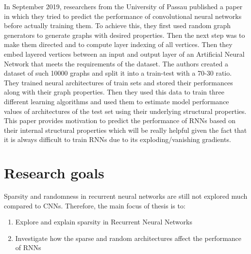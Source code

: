 \documentclass[acmlarge,screen,natbib=false]{acmart}
\begin{document}
In September 2019, researchers from the University of Passau published a paper \cite{julian} in which they tried to predict the performance of convolutional neural networks before actually training them. To achieve this, they first used random graph generators to generate graphs with desired properties. Then the next step was to make them directed and to compute layer indexing of all vertices. Then they embed layered vertices between an input and output layer of an Artificial Neural Network that meets the requirements of the dataset. The authors created a dataset of such 10000 graphs and split it into a train-test with a 70-30 ratio. They trained neural architectures of train sets and stored their performances along with their graph properties. Then they used this data to train three different learning algorithms and used them to estimate model performance values of architectures of the test set using their underlying structural properties. This paper provides motivation to predict the performance of RNNs based on their internal structural properties which will be really helpful given the fact that it is always difficult to train RNNs due to its exploding/vanishing gradients.

\section{Research goals}
Sparsity and randomness in recurrent neural networks are still not explored much compared to CNNs. Therefore, the main focus of thesis is to:
\begin{enumerate}[	1.]
	\item Explore and explain sparsity in Recurrent Neural Networks
	\item Investigate how the sparse and random architectures affect the performance of RNNs
\end{enumerate}

\end{document}
